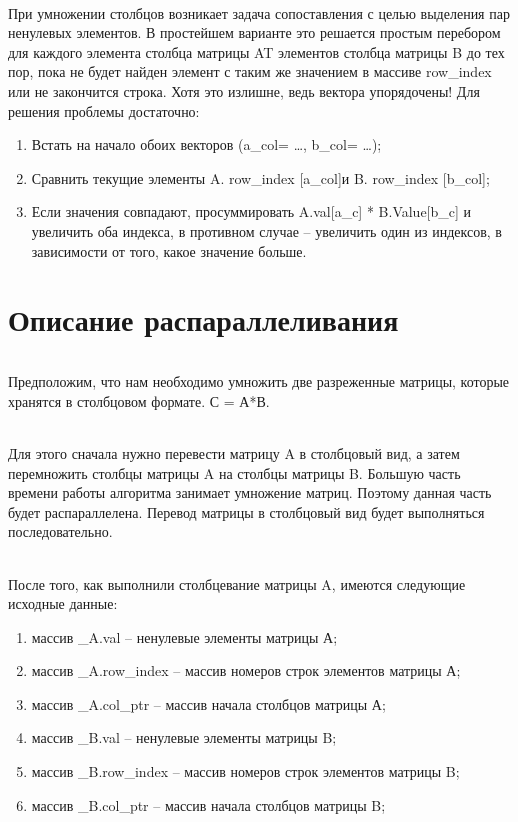 \documentclass[12pt,a4paper]{article}
\begin{document}
\paragraph{}При умножении столбцов возникает задача сопоставления с целью выделения пар ненулевых элементов. В простейшем варианте это решается простым перебором для каждого элемента столбца матрицы AT элементов столбца матрицы B до тех пор, пока не будет найден элемент с таким же значением в массиве row\_index или не закончится строка. Хотя это излишне, ведь вектора упорядочены! Для решения проблемы достаточно:
\begin{enumerate} 
\item Встать на начало обоих векторов (a\_col= …, b\_col= …);
\item Сравнить текущие элементы A. row\_index [a\_col]и B. row\_index [b\_col];
\item Если значения совпадают, просуммировать A.val[a\_c] * B.Value[b\_c] и увеличить оба индекса, в противном случае – увеличить один из индексов, в зависимости от того, какое значение больше.
\end{enumerate} 

\part*{Описание распараллеливания}
\paragraph{}Предположим, что нам необходимо умножить две разреженные матрицы, которые хранятся в столбцовом формате. С = А*В.
\paragraph{}Для этого сначала нужно перевести матрицу A в столбцовый вид, а затем перемножить столбцы матрицы A на столбцы матрицы B. Большую часть времени работы алгоритма занимает умножение матриц. Поэтому данная часть будет распараллелена. Перевод матрицы в столбцовый вид будет выполняться последовательно.
\paragraph{}После того, как выполнили столбцевание матрицы A, имеются следующие исходные данные:
\begin{enumerate} 
\item массив \_A.val – ненулевые элементы матрицы А;
\item массив \_A.row\_index – массив номеров строк элементов матрицы А;
\item массив \_A.col\_ptr – массив начала столбцов матрицы А;
\item массив \_B.val – ненулевые элементы матрицы B;
\item массив \_B.row\_index – массив номеров строк элементов матрицы B;
\item массив \_B.col\_ptr – массив начала столбцов матрицы B;
\end{enumerate} 
\end{document}
